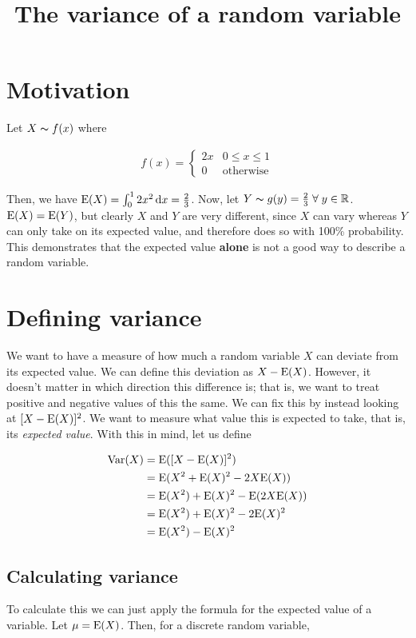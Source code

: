 

\title{The variance of a random variable}
\maketitle

\section{Motivation}
Let $X \thicksim f(x)$ where

\begin{align*}
  f(x) =
  \begin{cases}
    2x & 0 \leq x \leq 1 \\
    0 & \text{otherwise}
  \end{cases}
\end{align*}

Then, we have $\mathrm{E}(X) = \int_0^1 2x^2 \mathop{}\!\mathrm{d} x = \frac{2}{3}$. Now, let $Y \thicksim g(y) = \frac{2}{3} \;\forall\; y \in \mathbb{R}$. $\mathrm{E}(X) = \mathrm{E}(Y)$, but clearly $X$ and $Y$ are very different, since $X$ can vary whereas $Y$ can only take on its expected value, and therefore does so with 100\% probability. This demonstrates that the expected value \textbf{alone} is not a good way to describe a random variable.

\section{Defining variance}
We want to have a measure of how much a random variable $X$ can deviate from its expected value. We can define this deviation as $X - \mathrm{E}(X)$. However, it doesn't matter in which direction this difference is; that is, we want to treat positive and negative values of this the same. We can fix this by instead looking at $[X - \mathrm{E}(X)]^2$. We want to measure what value this is expected to take, that is, its \textit{expected value}. With this in mind, let us define

\begin{align*}
  \mathrm{Var}(X) &= \mathrm{E}([X - \mathrm{E}(X)]^2) \\
  &= \mathrm{E}(X^2 + \mathrm{E}(X)^2 - 2X\mathrm{E}(X)) \\
  &= \mathrm{E}(X^2) + \mathrm{E}(X)^2 - \mathrm{E}(2X\mathrm{E}(X)) \\
  &= \mathrm{E}(X^2) + \mathrm{E}(X)^2 - 2\mathrm{E}(X)^2 \\
  &= \mathrm{E}(X^2) - \mathrm{E}(X)^2
\end{align*}

\subsection{Calculating variance}
To calculate this we can just apply the formula for the expected value of a variable. Let $\mu = \mathrm{E}(X)$. Then, for a discrete random variable,

